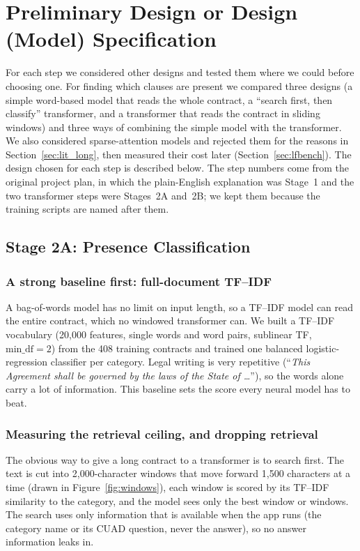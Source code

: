 \section{Preliminary Design or Design (Model) Specification}
For each step we considered other designs and tested them where we could before choosing one. For finding which clauses are present we compared three designs (a simple word-based model that reads the whole contract, a ``search first, then classify'' transformer, and a transformer that reads the contract in sliding windows) and three ways of combining the simple model with the transformer. We also considered sparse-attention models and rejected them for the reasons in Section~\ref{sec:lit_long}, then measured their cost later (Section~\ref{sec:lfbench}). The design chosen for each step is described below. The step numbers come from the original project plan, in which the plain-English explanation was Stage~1 and the two transformer steps were Stages~2A and~2B; we kept them because the training scripts are named after them.

\subsection{Stage 2A: Presence Classification}

\subsubsection{A strong baseline first: full-document TF--IDF}
A bag-of-words model has no limit on input length, so a TF--IDF model can read the entire contract, which no windowed transformer can. We built a TF--IDF vocabulary (20{,}000 features, single words and word pairs, sublinear TF, $\text{min\_df}=2$) from the 408 training contracts and trained one balanced logistic-regression classifier per category. Legal writing is very repetitive (``\emph{This Agreement shall be governed by the laws of the State of \ldots}''), so the words alone carry a lot of information. This baseline sets the score every neural model has to beat.

\subsubsection{Measuring the retrieval ceiling, and dropping retrieval}
\label{sec:ceiling}
The obvious way to give a long contract to a transformer is to search first. The text is cut into 2{,}000-character windows that move forward 1{,}500 characters at a time (drawn in Figure~\ref{fig:windows}), each window is scored by its TF--IDF similarity to the category, and the model sees only the best window or windows. The search uses only information that is available when the app runs (the category name or its CUAD question, never the answer), so no answer information leaks in.

